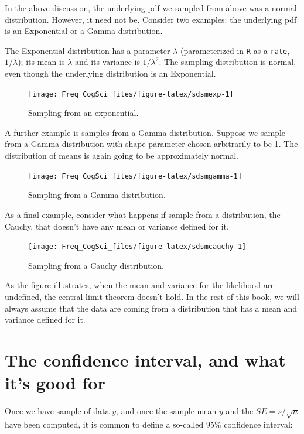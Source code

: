 \documentclass[12pt,]{krantz}
\begin{document}
In the above discussion, the underlying pdf we sampled from above was a normal distribution. However, it need not be. Consider two examples: the underlying pdf is an Exponential or a Gamma distribution.

The Exponential distribution has a parameter \(\lambda\) (parameterized in \texttt{R} as a \texttt{rate}, \(1/\lambda\)); its mean is \(\lambda\) and its variance is \(1/\lambda^2\). The sampling distribution is normal, even though the underlying distribution is an Exponential.

\begin{figure}
\texttt{[image: Freq\_CogSci\_files/figure-latex/sdsmexp-1]} \caption{Sampling from an exponential.}\label{fig:sdsmexp}
\end{figure}

A further example is samples from a Gamma distribution. Suppose we sample from a Gamma distribution with shape parameter chosen arbitrarily to be 1. The distribution of means is again going to be approximately normal.

\begin{figure}
\texttt{[image: Freq\_CogSci\_files/figure-latex/sdsmgamma-1]} \caption{Sampling from a Gamma distribution.}\label{fig:sdsmgamma}
\end{figure}

As a final example, consider what happens if sample from a distribution, the Cauchy, that doesn't have any mean or variance defined for it.

\begin{figure}
\texttt{[image: Freq\_CogSci\_files/figure-latex/sdsmcauchy-1]} \caption{Sampling from a Cauchy distribution.}\label{fig:sdsmcauchy}
\end{figure}

As the figure illustrates, when the mean and variance for the likelihood are undefined, the central limit theorem doesn't hold. In the rest of this book, we will always assume that the data are coming from a distribution that has a mean and variance defined for it.

\hypertarget{the-confidence-interval-and-what-its-good-for}{%
\section{The confidence interval, and what it's good for}\label{the-confidence-interval-and-what-its-good-for}}

Once we have sample of data \(y\), and once the sample mean \(\bar{y}\) and the \(SE = s/\sqrt{n}\) have been computed, it is common to define a so-called 95\% confidence interval:
\end{document}
